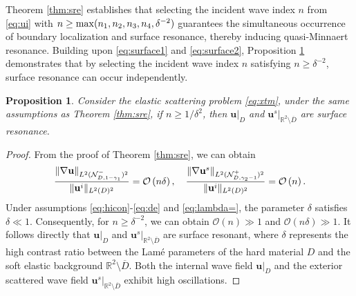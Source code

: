 \documentclass[11pt,reqno,twoside]{amsart}
\newtheorem{prop}{Proposition}[section]
\theoremstyle{definition}
\theoremstyle{remark}
\numberwithin{equation}{section}
\newcommand{\bu}{\mathbf{u}}
\begin{document}
			 Theorem \ref{thm:sre} establishes that selecting the incident wave index $n$ from \eqref{eq:ui} with \( n \geq \max(n_1, \\n_2, n_3, n_4, \delta^{-2}) \) guarantees the simultaneous occurrence of boundary localization and surface resonance, thereby inducing quasi-Minnaert resonance. Building upon \eqref{eq:surface1} and \eqref{eq:surface2}, Proposition \ref{prop1} demonstrates that by selecting the incident wave index $n$ satisfying $n \geq \delta^{-2}$, surface resonance can occur independently.
			
			\begin{prop}\label{prop1}
				Consider the elastic scattering problem \eqref{eq:xtm}, under the same assumptions as  Theorem \ref{thm:sre}, if $n \geq 1/\delta^2$, then  $\mathbf{u}|_{D}$ and $\mathbf{u}^s|_{\mathbb{R}^2 \setminus \overline{{D}}}$ are surface resonance.
			\end{prop}
			\begin{proof}
				From the proof of Theorem \ref{thm:sre}, we can obtain 
				\begin{align}\notag  
					\frac{\|\nabla\mathbf{u}\|_{L^2(\mathcal{N}_{D,1-\gamma_{1}}^{-})^2}}{\|{\bu}^i\|_{L^2(D)^2}}=\mathcal{O}\left(n\delta\right), \quad\frac{\|\nabla\bu^s\|_{L^2(\mathcal{N}_{D,\gamma_{2}-1}^{+})^2}}{\|\bu^i\|_{L^2(D)^2}}=\mathcal{O}\left({n}\right).  
				\end{align}
				Under assumptions \eqref{eq:hicon}-\eqref{eq:de} and \eqref{eq:lambda=}, the  parameter $\delta$ satisfies $\delta \ll 1$. Consequently, for  $n \geq\delta^{-2}$, we can obtain $\mathcal{O}\left({n}\right)\gg1$ and $\mathcal{O}\left(n\delta\right)\gg1$.
				It follows directly that $\mathbf{u}|_{D}$ and $\mathbf{u}^s|_{\mathbb{R}^2 \setminus \overline{{D}}}$ are surface resonant, where \(\delta\) represents the high contrast ratio between the Lam\'e parameters of the hard material \(D\) and the soft elastic background \(\mathbb{R}^2 \setminus \overline{D}\). Both the internal wave field \( \bu|_D \) and the exterior scattered wave field \( \bu^s|_{\mathbb{R}^2 \setminus \overline{D}} \) exhibit high oscillations.
			\end{proof}
			
\end{document}
